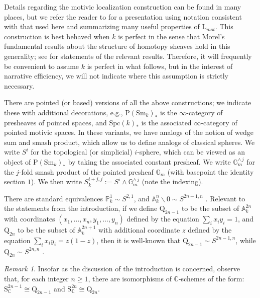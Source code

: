 \documentclass[11pt,leqno]{article}
\newcommand{\sma}{{\scriptstyle{\wedge}\,}}
\newcommand{\cplx}{{\mathbb C}}
\renewcommand{\P}{{\mathrm P}}
\newcommand{\pone}{{\mathbb P}^1}
\renewcommand{\1}{{\rm 1\hspace*{-0.4ex}%
\rule{0.1ex}{1.52ex}\hspace*{0.2ex}}}
\newcommand{\gm}[1]{{{\mathbb G}_{m}^{#1}}}
\renewcommand{\L}{{\mathrm L}}
\newcommand{\Sm}{\mathrm{Sm}}
\newcommand{\Spc}{\mathrm{Spc}}
\newcommand{\<}[1]{{\langle}#1 {\rangle}}
\renewcommand{\setminus}{\smallsetminus}
\newcounter{intro}
\theoremstyle{plain}
\theoremstyle{definition}
\theoremstyle{remark}
\newtheorem{rem}[theorem]{Remark}
\numberwithin{equation}{subsection}
\begin{document}
Details regarding the motivic localization construction can be found in many places, but we refer the reader to \cite[\S 2]{ABHFreudenthal} for a presentation using notation consistent with that used here and summarizing many useful properties of $\L_{mot}$.  This construction is best behaved when $k$ is perfect in the sense that Morel's fundamental results about the structure of homotopy sheaves hold in this generality; see \cite[Introduction]{MField} for statements of the relevant results.  Therefore, it will frequently be convenient to assume $k$ is perfect in what follows, but in the interest of narrative efficiency, we will not indicate where this assumption is strictly necessary.

There are pointed (or based) versions of all the above constructions; we indicate these with additional decorations, e.g., $\P(\Sm_k)_*$ is the $\infty$-category of presheaves of pointed spaces, and $\Spc(k)_*$ is the associated $\infty$-category of pointed motivic spaces.  In these variants, we have analogs of the notion of wedge sum and smash product, which allow us to define analogs of classical spheres.  We write $S^i$ for the topological (or simplicial) $i$-sphere, which can be viewed as an object of $\P(\Sm_k)_*$ by taking the associated constant presheaf.  We write $\gm{\sma j}$ for the $j$-fold smash product of the pointed presheaf $\gm{}$ (with basepoint the identity section $1$).  We then write $S^{i+j,j}_k := S^i \wedge \gm{\sma j}$ (note the indexing).  

There are standard equivalences $\pone_k \sim S^{2,1}$, and ${\mathbb A}_k^{n} \setminus 0 \sim S^{2n-1,n}$ \cite[\S 3.2]{MV}.  Relevant to the statements from the introduction, if we define $\mathrm{Q}_{2n-1}$ to be the subset of ${\mathbb A}^{2n}_k$ with coordinates $(x_1,\ldots,x_n,y_1,\ldots,y_n)$ defined by the equation $\sum_i x_iy_i = 1$, and $\mathrm{Q}_{2n}$ to be the subset of ${\mathbb A}^{2n+1}_k$ with additional coordinate $z$ defined by the equation $\sum_i x_iy_i = z(1-z)$, then it is well-known that $\mathrm{Q}_{2n-1} \sim S^{2n-1,n}$, while $\mathrm{Q}_{2n} \sim S^{2n,n}$ \cite{ADF}.  

\begin{rem}
	Insofar as the discussion of the introduction is concerned, observe that, for each integer $n \geq 1$, there are isomorphisms of $\cplx$-schemes of the form: $\mathrm{S}^{2n-1}_{\cplx} \cong \mathrm{Q}_{2n-1}$ and $\mathrm{S}^{2n}_{\cplx} \cong \mathrm{Q}_{2n}$.
\end{rem}
\end{document}
